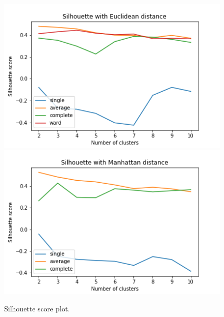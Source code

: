 \documentclass[12pt]{article}
\begin{document}
\begin{figure}[!h]
\centering
{}
  \includegraphics[width=\linewidth]{images/figure_silh_Euclidean_manually_selected_features.png}
\endminipage
{}
  \includegraphics[width=\linewidth]{images/figure_silh_Manhattan_manually_selected_features.png}
\endminipage
\caption{Silhouette score plot.}
\label{fig:silh_hierarchical}
\end{figure}
\end{document}
